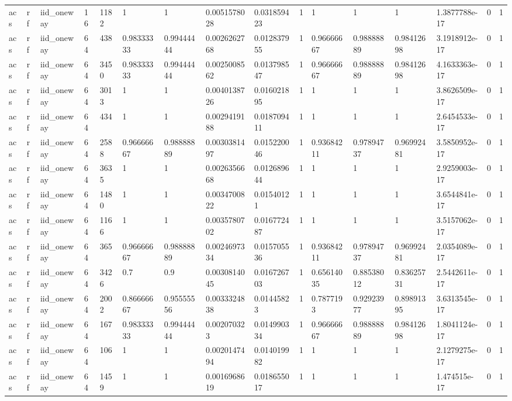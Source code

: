\begin{tabular}{llllllllllllllll}
acs & rf & iid\_oneway & 16 & 1182 & 1 & 1 & 0.0051578028 & 0.031859423 & 1 & 1 & 1 & 1 & 1.3877788e-17 & 0 & 1 \\
acs & rf & iid\_oneway & 64 & 438 & 0.98333333 & 0.99444444 & 0.0026262768 & 0.012837955 & 1 & 0.96666667 & 0.98888889 & 0.98412698 & 3.1918912e-17 & 0 & 1 \\
acs & rf & iid\_oneway & 64 & 3450 & 0.98333333 & 0.99444444 & 0.0025008562 & 0.013798547 & 1 & 0.96666667 & 0.98888889 & 0.98412698 & 4.1633363e-17 & 0 & 1 \\
acs & rf & iid\_oneway & 64 & 3013 & 1 & 1 & 0.0040138726 & 0.016021895 & 1 & 1 & 1 & 1 & 3.8626509e-17 & 0 & 1 \\
acs & rf & iid\_oneway & 64 & 434 & 1 & 1 & 0.0029419188 & 0.018709411 & 1 & 1 & 1 & 1 & 2.6454533e-17 & 0 & 1 \\
acs & rf & iid\_oneway & 64 & 2588 & 0.96666667 & 0.98888889 & 0.0030381497 & 0.015220046 & 1 & 0.93684211 & 0.97894737 & 0.96992481 & 3.5850952e-17 & 0 & 1 \\
acs & rf & iid\_oneway & 64 & 3635 & 1 & 1 & 0.0026356668 & 0.012689644 & 1 & 1 & 1 & 1 & 2.9259003e-17 & 0 & 1 \\
acs & rf & iid\_oneway & 64 & 1480 & 1 & 1 & 0.0034700822 & 0.01540121 & 1 & 1 & 1 & 1 & 3.6544841e-17 & 0 & 1 \\
acs & rf & iid\_oneway & 64 & 1166 & 1 & 1 & 0.0035780702 & 0.016772487 & 1 & 1 & 1 & 1 & 3.5157062e-17 & 0 & 1 \\
acs & rf & iid\_oneway & 64 & 365 & 0.96666667 & 0.98888889 & 0.0024697334 & 0.015705536 & 1 & 0.93684211 & 0.97894737 & 0.96992481 & 2.0354089e-17 & 0 & 1 \\
acs & rf & iid\_oneway & 64 & 3426 & 0.7 & 0.9 & 0.0030814045 & 0.016726703 & 1 & 0.65614035 & 0.88538012 & 0.83625731 & 2.5442611e-17 & 0 & 1 \\
acs & rf & iid\_oneway & 64 & 2002 & 0.86666667 & 0.95555556 & 0.0033324838 & 0.01445823 & 1 & 0.7877193 & 0.92923977 & 0.89891395 & 3.6313545e-17 & 0 & 1 \\
acs & rf & iid\_oneway & 64 & 167 & 0.98333333 & 0.99444444 & 0.002070323 & 0.014990334 & 1 & 0.96666667 & 0.98888889 & 0.98412698 & 1.8041124e-17 & 0 & 1 \\
acs & rf & iid\_oneway & 64 & 106 & 1 & 1 & 0.0020147494 & 0.014019982 & 1 & 1 & 1 & 1 & 2.1279275e-17 & 0 & 1 \\
acs & rf & iid\_oneway & 64 & 1459 & 1 & 1 & 0.0016968619 & 0.018655017 & 1 & 1 & 1 & 1 & 1.474515e-17 & 0 & 1 \\

\end{tabular}

